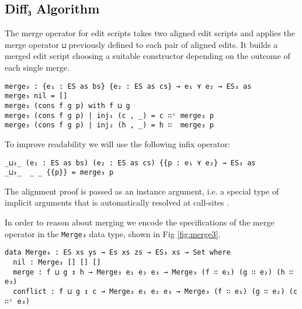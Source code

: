 \documentclass[preprint]{sigplanconf}
\begin{document}
        \subsection{Diff₃ Algorithm}
        \label{subsec:diff3-algo}

	The merge operator for edit scripts takes two aligned edit scripts and
	applies the merge operator \texttt{⊔} previously defined to
	each pair of aligned edits. It builds a merged edit script choosing a 
	suitable constructor depending on the outcome of each single merge.

\begin{verbatim}
merge₃ : {e₁ : ES as bs} {e₂ : ES as cs} → e₁ ⋎ e₂ → ES₃ as
merge₃ nil = []
merge₃ (cons f g p) with f ⊔ g
merge₃ (cons f g p) | inj₁ (c , _) = c ∷ᶜ merge₃ p
merge₃ (cons f g p) | inj₂ (h , _) = h ∷  merge₃ p
\end{verbatim}
	To improve readability we will use the following infix
        operator:
\begin{verbatim}
_⊔₃_ (e₁ : ES as bs) (e₂ : ES as cs) {{p : e₁ ⋎ e₂} → ES₃ as
_⊔₃_  _ _ {{p}} = merge₃ p
\end{verbatim}
	The alignment proof is passed  as an instance argument, i.e. a
        special  type  of  implicit arguments  that  is  automatically
        resolved at call-sites \cite{Devriese11}.

        In order to reason about merging we encode the specifications
        of the merge operator in the \texttt{Merge₃} data type, shown
        in Fig \ref{fig:merge3}.  

\begin{figure*}[t!]
\centering
\begin{verbatim}
data Merge₃ : ES xs ys → Es xs zs → ES₃ xs → Set where
  nil : Merge₃ [] [] []
  merge : f ⊔ g ↧ h → Merge₃ e₁ e₂ e₃ → Merge₃ (f ∷ e₁) (g ∷ e₂) (h ∷ e₃)
  conflict : f ⊔ g ↥ c → Merge₃ e₁ e₂ e₃ → Merge₃ (f ∷ e₁) (g ∷ e₂) (c ∷ᶜ e₃)
\end{verbatim}
\caption{Merge operator specification}
\label{fig:merge3}
\end{figure*}
\end{document}
